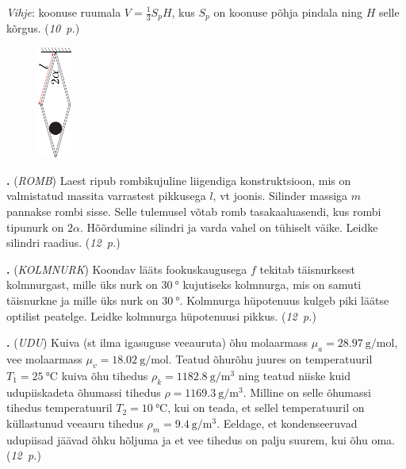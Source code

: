 \documentclass[11pt,a5paper]{article}
\newcommand{\numb}[1]{\vspace{5pt}\textbf{\large #1}}
\newcommand{\nimi}[1]{(\textsl{\small \uppercase{#1}})}
\newcommand{\punktid}[1]{(\emph{#1~p.})}
\newcounter{ylesanne}
\newcommand{\yl}[1]{\addtocounter{ylesanne}{1}\numb{\theylesanne.} \nimi{#1} \newblock{}}
\newcommand{\autor}[1]{}%
\begin{document}
\textit{Vihje}: koonuse ruumala $V=\frac{1}{3}S_p H$, kus $S_p$ on koonuse põhja pindala ning $H$ selle kõrgus.
\punktid{10} \autor{Uku Andreas Reigo}

\newpage
\begin{figure}
  \vspace*{-0mm}
  \includegraphics[width = 0.1\textwidth]{rhombus-ball.pdf}
\end{figure}
\yl{Romb}
Laest ripub rombikujuline liigendiga konstruktsioon, mis on valmistatud massita varrastest pikkusega $l$, vt joonis. Silinder massiga $m$ pannakse rombi sisse. Selle tulemusel võtab romb tasakaaluasendi, kus rombi tipunurk on $2\alpha$. Hõõrdumine silindri ja varda vahel on tühiselt väike. Leidke silindri raadius.
\punktid{12} \autor{Jaan Kalda}

\yl{Kolmnurk}
Koondav lääts fookuskaugusega $f$ tekitab täisnurksest kolmnurgast, mille üks nurk on $\SI{30}{\degree}$ kujutiseks kolmnurga, mis on samuti täisnurkne ja mille üks nurk on  $\SI{30}{\degree}$. Kolmnurga hüpotenuus kulgeb piki läätse optilist peatelge. Leidke kolmnurga hüpotenuusi pikkus.
\punktid{12} \autor{Jaan Kalda}

\yl{Udu}
Kuiva (st ilma igasuguse veeauruta) õhu molaarmass $\mu_a=\SI{28.97}{\g\per\mole}$, vee molaarmass $\mu_v=\SI{18.02}{\g\per\mole}$. Teatud õhurõhu juures on temperatuuril $T_1=\SI{25}\celsius$ kuiva õhu tihedus $\rho_k=\SI{1182.8}{\g\per\m\cubed}$ ning teatud niiske kuid udupiiskadeta õhumassi tihedus $\rho=\SI{1169.3}{\g\per\m\cubed}$. Milline on selle õhumassi tihedus temperatuuril $T_2=\SI{10}\celsius$, kui on teada, et sellel temperatuuril on küllastunud veeauru tihedus $\rho_m=\SI{9.4}{\g\per\m\cubed}$. Eeldage, et kondenseeruvad udupiisad jäävad õhku hõljuma ja et vee tihedus on palju suurem, kui õhu oma.
\punktid{12} \autor{Jaan Kalda}
\end{document}
